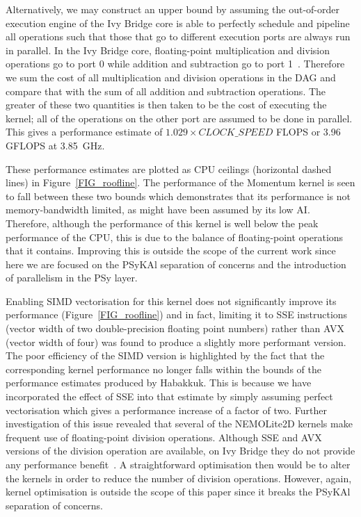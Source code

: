 \documentclass[gmdd, manuscript]{copernicus}
\begin{document}
Alternatively, we may construct an upper bound by assuming the
out-of-order execution engine of the Ivy Bridge core is able to
perfectly schedule and pipeline all operations such that those that go
to different execution ports are always run in parallel. In the Ivy
Bridge core, floating-point multiplication and division operations go
to port 0 while addition and subtraction go to port
1~\citep{fog_instructions}. Therefore we sum the cost of all
multiplication and division operations in the DAG and compare that
with the sum of all addition and subtraction operations. The greater
of these two quantities is then taken to be the cost of executing the
kernel; all of the operations on the other port are assumed to be done
in parallel. This gives a performance estimate of $1.029 \times
CLOCK\_SPEED$ FLOPS or 3.96 GFLOPS at 3.85~GHz.

These performance estimates are plotted as CPU ceilings (horizontal
dashed lines) in Figure~\ref{FIG_roofline}. The performance of the
Momentum kernel is seen to fall between these two bounds which
demonstrates that its performance is not memory-bandwidth limited, as
might have been assumed by its low AI. Therefore, although the
performance of this kernel is well below the peak performance of the
CPU, this is due to the balance of floating-point operations that it
contains. Improving this is outside the scope of the current work
since here we are focused on the {PS}y{KA}l separation of concerns and
the introduction of parallelism in the PSy layer.

Enabling SIMD vectorisation for this kernel does not significantly
improve its performance (Figure~\ref{FIG_roofline}) and in fact,
limiting it to SSE instructions (vector width of two double-precision
floating point numbers) rather than AVX (vector width of four) was
found to produce a slightly more performant version. The poor
efficiency of the SIMD version is highlighted by the fact that the
corresponding kernel performance no longer falls within the bounds of
the performance estimates produced by Habakkuk. This is because we
have incorporated the effect of SSE into that estimate by simply
assuming perfect vectorisation which gives a performance increase of a
factor of two.  Further investigation of this issue revealed that
several of the NEMOLite2D kernels make frequent use of floating-point
division operations. Although SSE and AVX versions of the division
operation are available, on Ivy Bridge they do not provide any
performance benefit~\citep{fog_instructions}. A straightforward
optimisation then would be to alter the kernels in order to reduce the
number of division operations. However, again, kernel optimisation is
outside the scope of this paper since it breaks the PSyKAl separation
of concerns.
\end{document}
